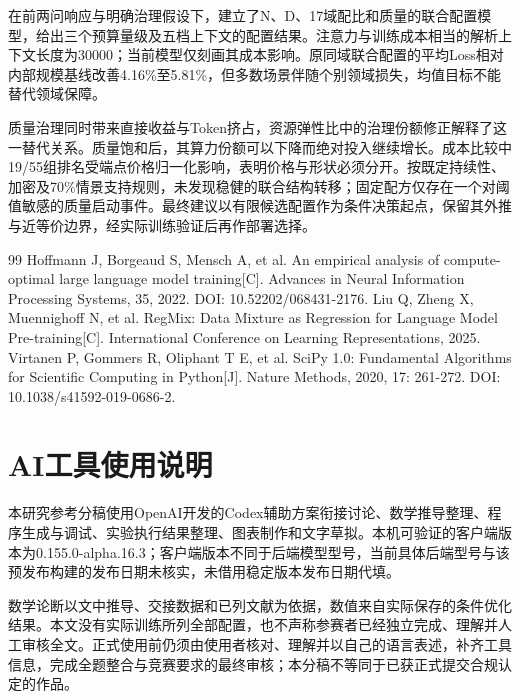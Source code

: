 \documentclass[UTF8,12pt,a4paper]{ctexart}
\begin{document}
在前两问响应与明确治理假设下，建立了N、D、17域配比和质量的联合配置模型，给出三个预算量级及五档上下文的配置结果。注意力与训练成本相当的解析上下文长度为30000；当前模型仅刻画其成本影响。原同域联合配置的平均Loss相对内部规模基线改善4.16\%至5.81\%，但多数场景伴随个别领域损失，均值目标不能替代领域保障。


质量治理同时带来直接收益与Token挤占，资源弹性比中的治理份额修正解释了这一替代关系。质量饱和后，其算力份额可以下降而绝对投入继续增长。成本比较中19/55组排名受端点价格归一化影响，表明价格与形状必须分开。按既定持续性、加密及70\%情景支持规则，未发现稳健的联合结构转移；固定配方仅存在一个对阈值敏感的质量启动事件。最终建议以有限候选配置作为条件决策起点，保留其外推与近等价边界，经实际训练验证后再作部署选择。

\begin{thebibliography}{99}
 Hoffmann J, Borgeaud S, Mensch A, et al. An empirical analysis of compute-optimal large language model training[C]. Advances in Neural Information Processing Systems, 35, 2022. DOI: 10.52202/068431-2176.
 Liu Q, Zheng X, Muennighoff N, et al. RegMix: Data Mixture as Regression for Language Model Pre-training[C]. International Conference on Learning Representations, 2025.
 Virtanen P, Gommers R, Oliphant T E, et al. SciPy 1.0: Fundamental Algorithms for Scientific Computing in Python[J]. Nature Methods, 2020, 17: 261-272. DOI: 10.1038/s41592-019-0686-2.
\end{thebibliography}
\section*{AI工具使用说明}
本研究参考分稿使用OpenAI开发的Codex辅助方案衔接讨论、数学推导整理、程序生成与调试、实验执行结果整理、图表制作和文字草拟。本机可验证的客户端版本为0.155.0-alpha.16.3；客户端版本不同于后端模型型号，当前具体后端型号与该预发布构建的发布日期未核实，未借用稳定版本发布日期代填。

数学论断以文中推导、交接数据和已列文献为依据，数值来自实际保存的条件优化结果。本文没有实际训练所列全部配置，也不声称参赛者已经独立完成、理解并人工审核全文。正式使用前仍须由使用者核对、理解并以自己的语言表述，补齐工具信息，完成全题整合与竞赛要求的最终审核；本分稿不等同于已获正式提交合规认定的作品。
\end{document}
